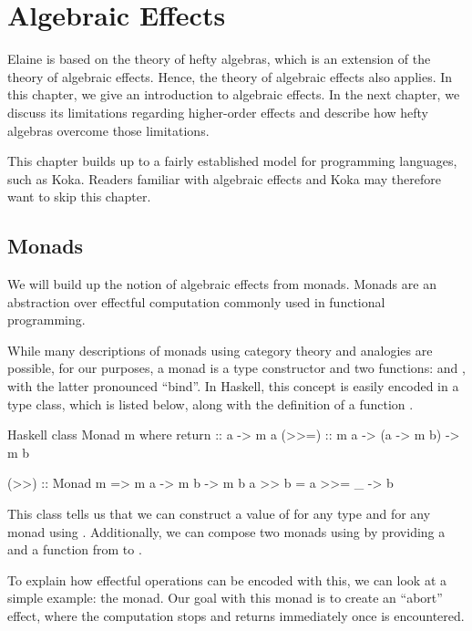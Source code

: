 \chapter{Algebraic Effects}\label{chap:algebraic_effects}

Elaine is based on the theory of hefty algebras, which is an extension of the theory of algebraic effects. Hence, the theory of algebraic effects also applies. In this chapter, we give an introduction to algebraic effects. In the next chapter, we discuss its limitations regarding higher-order effects and describe how hefty algebras overcome those limitations.

This chapter builds up to a fairly established model for programming languages, such as Koka. Readers familiar with algebraic effects and Koka may therefore want to skip this chapter.

\section{Monads}


We will build up the notion of algebraic effects from monads. Monads are an abstraction over effectful computation commonly used in functional programming.

While many descriptions of monads using category theory and analogies are possible, for our purposes, a monad is a type constructor  and two functions:  and \hs{>>=}, with the latter pronounced ``bind''. In Haskell, this concept is easily encoded in a type class, which is listed below, along with the definition of a function \hs{>>}.

\begin{lst}{Haskell}
class Monad m where
  return :: a -> m a
  (>>=) :: m a -> (a -> m b) -> m b

(>>) :: Monad m => m a -> m b -> m b
a >> b = a >>= \_ -> b
\end{lst}

This class tells us that we can construct a value of  for any type  and for any monad  using . Additionally, we can compose two monads using \hs{>>=} by providing a  and a function from  to .

To explain how effectful operations can be encoded with this, we can look at a simple example: the  monad. Our goal with this monad is to create an ``abort'' effect, where the computation stops and returns immediately once  is encountered.

